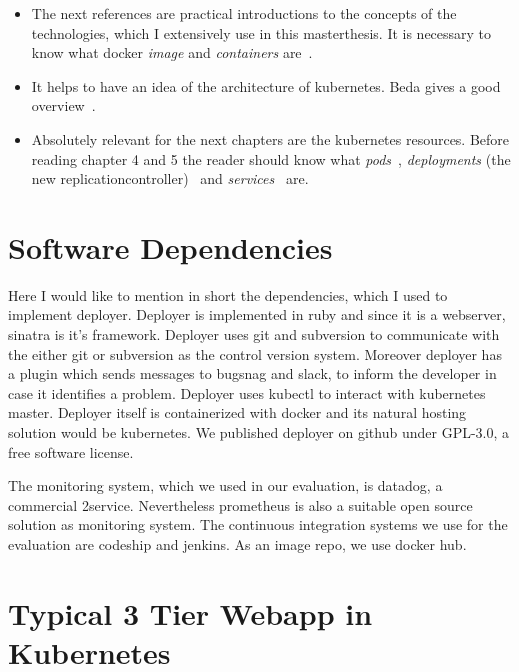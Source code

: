 \begin{itemize}

\item The next references are practical introductions to the concepts of the technologies,
  which I extensively use in this masterthesis. It is necessary to know what docker
  \emph{image} and \emph{containers}
  are~\cite{docker_orientation}\cite{docker_orientation2}.

\item It helps to have an idea of the architecture of kubernetes. Beda gives a good
  overview~\cite{kubernetes_architecture2}.

\item Absolutely relevant for the next chapters are the kubernetes resources. Before
  reading chapter 4 and 5 the reader should know what \emph{pods}~\cite{pod},
  \emph{deployments} (the new replicationcontroller)~\cite{replicationcontroller} and
  \emph{services}~\cite{service} are.

\end{itemize}


\section{Software Dependencies}

Here I would like to mention in short the dependencies, which I used to implement
deployer. Deployer is implemented in ruby\cite{ruby} and since it is a webserver,
sinatra\cite{sinatra} is it's framework. Deployer uses git\cite{git} and
subversion\cite{svn} to communicate with the either git or subversion as the control
version system. Moreover deployer has a plugin which sends messages to
bugsnag\cite{bugsnag} and slack\cite{slack}, to inform the developer in case it identifies
a problem. Deployer uses kubectl to interact with kubernetes\cite{kubernetes}
master. Deployer itself is containerized with docker\cite{docker} and its natural hosting
solution would be kubernetes. We published deployer on github\cite{deployer} under
GPL-3.0, a free software license.

The monitoring system, which we used in our evaluation, is datadog\cite{datadog}, a
commercial 2service. Nevertheless prometheus\cite{prometheus} is also a suitable open
source solution as monitoring system. The continuous integration systems we use for the
evaluation are codeship\cite{codeship} and jenkins\cite{jenkins}. As an image repo, we use
docker hub\cite{dockerhub}.


\section{Typical 3 Tier Webapp in Kubernetes}

